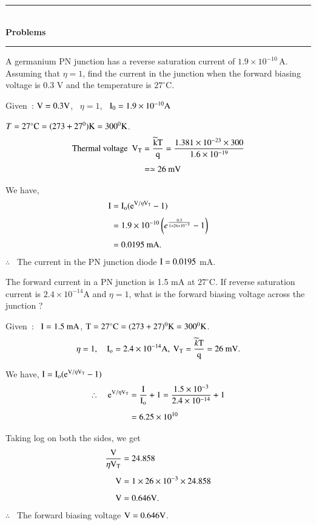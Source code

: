 \begin{center}
\rule{4cm}{1pt}\\
{\bf\Large Problems}\\[-3pt]
\rule{4cm}{1pt}
\end{center}

\begin{problem}\label{prob1.1}
A germanium PN junction has a reverse saturation current of $1.9\times 10^{-10}$\,A. Assuming that $\eta=1$, find the current in the junction when the forward biasing voltage is 0.3 V and the temperature is $27^{\circ}$C.
\end{problem}

\begin{solution}
Given~: $\textrm{V}=0.3\textrm{V}$, \ $\eta=1$, \ $\textrm{I}_{0}=1.9\times 10^{-10}\textrm{A}$

$T=27^{\circ}\textrm{C}= (273+27^{0})\textrm{K}=300^{0}\textrm{K}$.
\begin{align*}
\text{Thermal voltage~~} \textrm{V}_{\textrm{T}} &= \frac{\widetilde{\textrm{k}}\textrm{T}}{\textrm{q}}=\frac{1.381\times 10^{-23}\times 300}{1.6\times 10^{-19}}\\[3pt]
&= \simeq 26~\text{mV}
\end{align*}

We have,
\begin{align*}
\textrm{I} &= \textrm{I}_{\textrm{o}}(\textrm{e}^{\textrm{V}/\eta\textrm{V}_{\textrm{T}}}-1)\\[3pt]
     &= 1.9\times 10^{-10}\left(e^{\frac{0.3}{1\times 26\times 10^{-3}}}-1\right)\\[3pt]
     &= 0.0195\text{~mA.}
\end{align*}
$\therefore$~ The current in the PN junction diode $\textrm{I} = 0.0195$ mA.
\end{solution}

\eject

\begin{problem}\label{prob1.2}
The forward current in a PN junction is 1.5 mA at $27^{\circ}$C. If reverse saturation current is $2.4\times 10^{-14}$A and $\eta=1$, what is the forward biasing voltage across the junction ?
\end{problem}

\begin{solution}
Given~: \ $\textrm{I}=1.5\text{~mA}$, $\textrm{T}=27^{\circ}\textrm{C}=(273+27)^{0}\textrm{K}=300^{0}\textrm{K}$.
$$
\eta = 1,\quad \rmI_{\rmo}=2.4\times 10^{-14}\rmA, \ \rmV_{\rmT}=\dfrac{\widetilde{k}\rmT}{\rmq}=26\text{~mV}.
$$

We have, $\textrm{I}=\textrm{I}_{\textrm{o}}(\textrm{e}^{\textrm{V}/\eta \textrm{V}_{\textrm{T}}}-1)$
\begin{align*}
\therefore\quad \textrm{e}^{\textrm{V}/\eta \textrm{V}_{\textrm{T}}} &= \frac{\textrm{I}}{\textrm{I}_{\textrm{o}}}+1=\frac{1.5\times 10^{-3}}{2.4\times 10^{-14}}+1\\[5pt]
&= 6.25\times 10^{10}
\end{align*}

Taking log on both the sides, we get
\begin{align*}
\frac{\textrm{V}}{\eta\textrm{V}_{\textrm{T}}} &= 24.858\\[5pt]
\textrm{V} &= 1\times 26\times 10^{-3}\times 24.858\\[5pt]
\textrm{V} &= 0.646\textrm{V}.
\end{align*}
$\therefore$~ The forward biasing voltage $\textrm{V}=0.646\textrm{V}$.
\end{solution}

